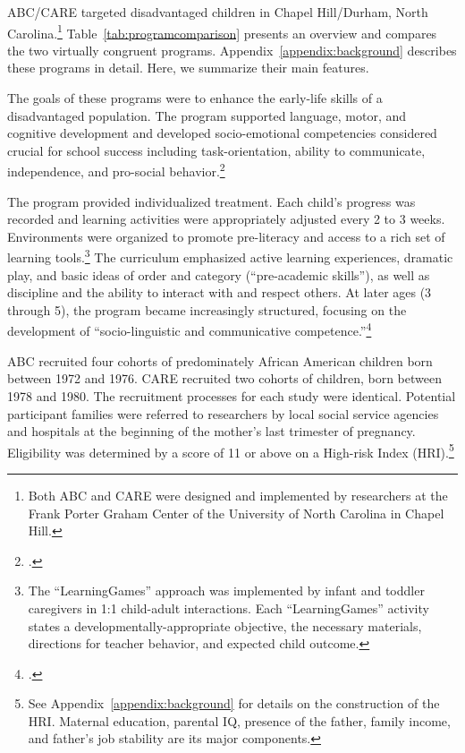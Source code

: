 ABC/CARE targeted disadvantaged children in Chapel Hill/Durham, North Carolina.\footnote{Both ABC and CARE were designed and implemented by researchers at the Frank Porter Graham Center of the University of North Carolina in Chapel Hill.} Table~\ref{tab:programcomparison} presents an overview and compares the two virtually congruent programs. Appendix~\ref{appendix:background} describes these programs in detail. Here, we summarize their main features.

The goals of these programs were to enhance the early-life skills of a disadvantaged population. The program supported language, motor, and cognitive development and developed socio-emotional competencies considered crucial for school success including task-orientation, ability to communicate, independence, and pro-social behavior.\footnote{\citet{Ramey_Collier_etal_1976_CarolinaAbecedarianProject, Ramey_etal_1985_Project-CARE_TiECSE, Sparling_1974_Synth_Edu_Infant_SPEECH, Wasik_Ramey_etal_1990_CD, Ramey-etal_2012-ABC}.}

The program provided individualized treatment. Each child's progress was recorded and learning activities were appropriately adjusted every 2 to 3 weeks. Environments were organized to promote pre-literacy and access to a rich set of learning tools.\footnote{The ``LearningGames'' approach was implemented by infant and toddler caregivers in 1:1 child-adult interactions. Each ``LearningGames'' activity states a developmentally-appropriate objective, the necessary materials, directions for teacher behavior, and expected child outcome.} The curriculum emphasized active learning experiences, dramatic play, and basic ideas of order and category (``pre-academic skills''), as well as discipline and the ability to interact with and respect others.  At later ages (3 through 5), the program became increasingly structured, focusing on the development of ``socio-linguistic and communicative competence.''\footnote{\citet{Ramey-et-al_1977_Intro-to-ABC, Haskins_1985_CD, Ramey_1981_Modification, Ramey_Campbell_1979_SR, Ramey_Smith_1977_AJMD, Ramey_McGinness_etal_1982_Abecedarianapproach, Sparling_Lewis_1979_BOOKLearninggamesFirstThree,Sparling_Lewis_1984_BOOKLearningGamesThreesFours}.}

ABC recruited four cohorts of predominately African American children born between 1972 and 1976. CARE recruited two cohorts of children, born between 1978 and 1980. The recruitment processes for each study were identical. Potential participant families were referred to researchers by local social service agencies and hospitals at the beginning of the mother's last trimester of pregnancy. Eligibility was determined by a score of 11 or above on a High-risk Index (HRI).\footnote{See Appendix~\ref{appendix:background} for details on the construction of the HRI. Maternal education, parental IQ, presence of the father, family income, and father's job stability are its major components.}

